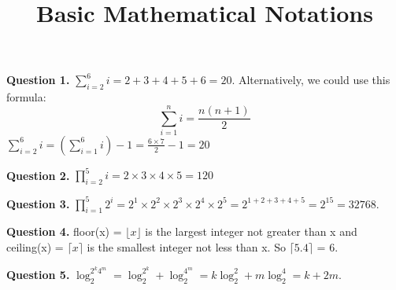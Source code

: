 \documentclass{ximera}
\title{Basic Mathematical Notations}
\begin{document}
\maketitle

\textbf{Question 1.} $\sum_{i=2}^6 i = 2 + 3 + 4 + 5 + 6 = 20$. Alternatively, we could use this formula:
\begin{equation*}
\sum_{i=1}^n i = \frac{n(n+1)}{2}
\end{equation*}
$\sum_{i=2}^6 i = \left(\sum_{i=1}^6 i\right) - 1 = \frac{6 \times 7}{2} - 1 = 20	$

\textbf{Question 2.} $\prod_{i=2}^5 i = 2 \times 3 \times 4 \times 5 = 120$

\textbf{Question 3.} $\prod_{i=1}^5 2^i = 2^1 \times 2^2 \times 2^3 \times 2^4 \times 2^5 = 2^{1 + 2 + 3 + 4 + 5} = 2^{15} = 32768$. 

\textbf{Question 4.}  floor(x) = $\lfloor x\rfloor$ is the largest integer not greater than x and ceiling(x) = $\lceil x \rceil$ is the smallest integer not less than x. So $\lceil 5.4 \rceil$ = 6.

\textbf{Question 5.} $\log_2^{2^k 4^m} = \log_2^{2^k} + \log_2^{4^m} = k \log_2^2 + m \log_2^4 = k + 2m$.
\end{document}
